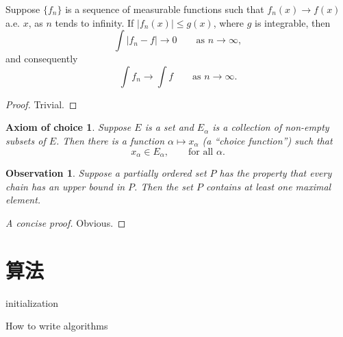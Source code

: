 \begin{theorem}
  Suppose $\{f_n\}$ is a sequence of measurable functions such that
  $f_n(x) \to f(x)$ a.e. $x$, as $n$ tends to infinity.
  If $|f_n(x)| \le g(x)$, where $g$ is integrable, then
  \begin{equation}
    \int |f_n - f| \to 0 \qquad \text{as } n \to \infty,
  \end{equation}
  and consequently
  \begin{equation}
    \int f_n \to \int f \qquad \text{as } n \to \infty.
  \end{equation}
\end{theorem}

\begin{proof}
  Trivial.
\end{proof}

\newtheorem*{axiomofchoice}{Axiom of choice}
\begin{axiomofchoice}
  Suppose $E$ is a set and ${E_\alpha}$ is a collection of
  non-empty subsets of $E$. Then there is a function $\alpha
  \mapsto x_\alpha$ (a ``choice function'') such that
  \begin{equation}
    x_\alpha \in E_\alpha,\qquad \text{for all }\alpha.
  \end{equation}
\end{axiomofchoice}

\newtheorem{observation}{Observation}
\begin{observation}
  Suppose a partially ordered set $P$ has the property
  that every chain has an upper bound in $P$. Then the
  set $P$ contains at least one maximal element.
\end{observation}
\begin{proof}[A concise proof]
  Obvious.
\end{proof}

\section{算法}
\begin{algorithm}[H]
\SetAlgoLined
{}
initialization\;
\caption{How to write algorithms}
\end{algorithm}
